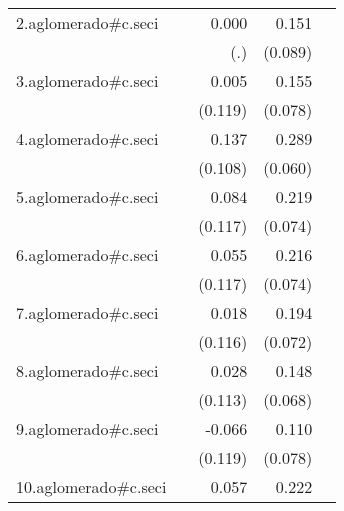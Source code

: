 {\begin{longtable}{l*{4}{D{.}{.}{-1}}}
\addlinespace
2.aglomerado#c.seci&                     &       0.000         &       0.151         &                     \\
            &                     &         (.)         &     (0.089)         &                     \\
\addlinespace
3.aglomerado#c.seci&                     &       0.005         &       0.155\sym{*}  &                     \\
            &                     &     (0.119)         &     (0.078)         &                     \\
\addlinespace
4.aglomerado#c.seci&                     &       0.137         &       0.289\sym{***}&                     \\
            &                     &     (0.108)         &     (0.060)         &                     \\
\addlinespace
5.aglomerado#c.seci&                     &       0.084         &       0.219\sym{**} &                     \\
            &                     &     (0.117)         &     (0.074)         &                     \\
\addlinespace
6.aglomerado#c.seci&                     &       0.055         &       0.216\sym{**} &                     \\
            &                     &     (0.117)         &     (0.074)         &                     \\
\addlinespace
7.aglomerado#c.seci&                     &       0.018         &       0.194\sym{**} &                     \\
            &                     &     (0.116)         &     (0.072)         &                     \\
\addlinespace
8.aglomerado#c.seci&                     &       0.028         &       0.148\sym{*}  &                     \\
            &                     &     (0.113)         &     (0.068)         &                     \\
\addlinespace
9.aglomerado#c.seci&                     &      -0.066         &       0.110         &                     \\
            &                     &     (0.119)         &     (0.078)         &                     \\
\addlinespace
10.aglomerado#c.seci&                     &       0.057         &       0.222\sym{***}&                     \\

\end{longtable}}
